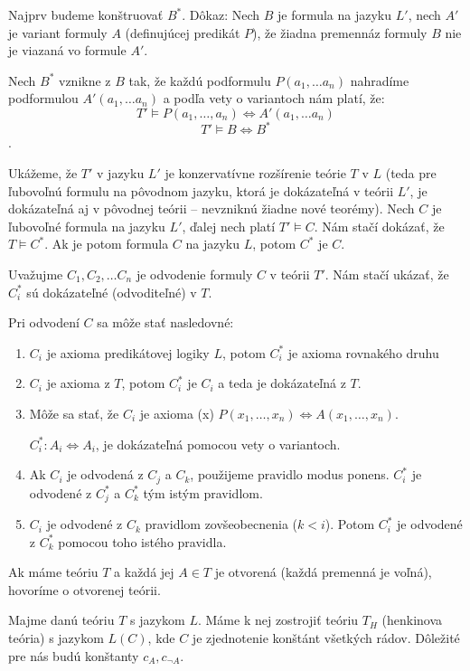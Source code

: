 \par Najprv budeme konštruovať $B^*$. Dôkaz: Nech $B$ je formula na jazyku $L'$,
nech $A'$ je variant  formuly $A$ (definujúcej predikát $P$), že žiadna
premennáz formuly $B$ nie je viazaná vo formule $A'$.

\par Nech $B^*$ vznikne z $B$ tak, že každú podformulu $P(a_1, \ldots a_n)$
nahradíme podformulou $A'(a_1, \ldots a_n)$ a podľa vety o variantoch nám platí,
že:
$$ T' \models P(a_1, \ldots, a_n) \iff A'(a_1, \ldots a_n)$$
$$ T' \models B \iff B^*$$.

\par Ukážeme, že $T'$ v jazyku $L'$ je konzervatívne rozšírenie teórie $T$ v
$L$ (teda pre ľubovoľnú formulu na pôvodnom jazyku, ktorá je dokázateľná v
teórii $L'$, je dokázateľná aj v pôvodnej teórii --  nevzniknú žiadne nové
teorémy). Nech $C$ je ľubovoľné formula na jazyku $L'$, ďalej nech platí $T'
\models C$. Nám stačí dokázať, že $T \models C^*$. Ak je potom formula $C$ na
jazyku $L$, potom $C^*$ je $C$.
\par Uvažujme $C_1, C_2, \ldots C_n$ je odvodenie formuly $C$ v teórii $T'$. Nám
stačí ukázať, že $C_i^*$ sú dokázateľné (odvoditeľné) v $T$.

Pri odvodení $C$ sa môže stať nasledovné:
\begin{enumerate}
	\item $C_i$ je axioma predikátovej logiky $L$, potom $C_i^*$ je axioma
	rovnakého druhu
	\item $C_i$ je axioma z $T$, potom $C_i^*$ je $C_i$ a teda je
	dokázateľná z $T$.
	\item Môže sa stať, že $C_i$ je axioma (x) $P(x_1,  \ldots, x_n) \iff
	A(x_1, \ldots, x_n)$. \par $C_i^*: A_i \iff A_i$, je dokázateľná pomocou
	vety o variantoch.
	\item Ak $C_i$ je odvodená z $C_j$ a $C_k$, použijeme pravidlo modus
	ponens. $C_i^*$ je odvodené z $C_j^*$ a $C_k^*$ tým istým pravidlom.
	\item $C_i$ je odvodené z $C_k$ pravidlom zovšeobecnenia ($k<i$). Potom
	$C_i^*$ je odvodené z $C_k^*$ pomocou toho istého pravidla.
\end{enumerate}



Ak máme teóriu $T$ a každá jej $A \in T$ je otvorená (každá premenná je voľná),
hovoríme o otvorenej teórii.

\par Majme danú teóriu $T$ s jazykom $L$. Máme k nej zostrojiť teóriu $T_H$
(henkinova teória) s jazykom $L(C)$, kde $C$ je zjednotenie konštánt všetkých
rádov. Dôležité pre nás budú konštanty $c_A, c_{\neg A}$.

